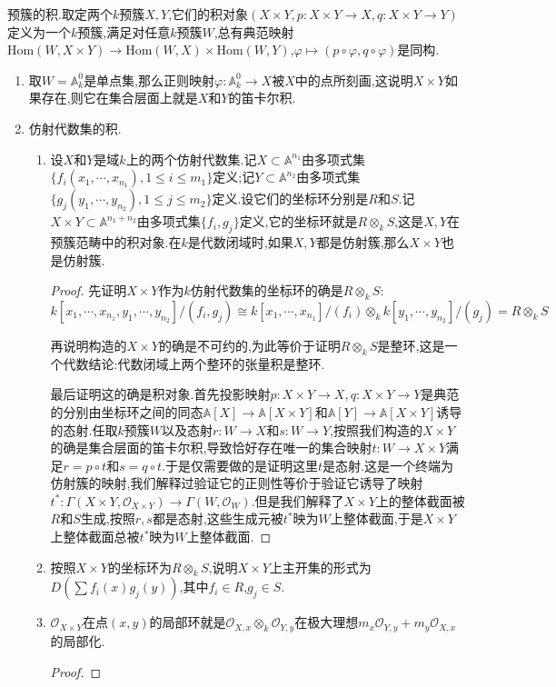 预簇的积.取定两个$k$预簇$X,Y$,它们的积对象$(X\times Y,p:X\times Y\to X,q:X\times Y\to Y)$定义为一个$k$预簇,满足对任意$k$预簇$W$,总有典范映射$\mathrm{Hom}(W,X\times Y)\to\mathrm{Hom}(W,X)\times\mathrm{Hom}(W,Y)$,$\varphi\mapsto(p\circ\varphi,q\circ\varphi)$是同构.
\begin{enumerate}
	\item 取$W=\mathbb{A}^0_k$是单点集,那么正则映射$\varphi:\mathbb{A}_k^0\to X$被$X$中的点所刻画,这说明$X\times Y$如果存在,则它在集合层面上就是$X$和$Y$的笛卡尔积.
	\item 仿射代数集的积.
	\begin{enumerate}
		\item 设$X$和$Y$是域$k$上的两个仿射代数集.记$X\subset\mathbb{A}^{n_1}$由多项式集$\{f_i(x_1,\cdots,x_{n_1}),1\le i\le m_1\}$定义;记$Y\subset\mathbb{A}^{n_2}$由多项式集$\{g_j(y_1,\cdots,y_{n_2}),1\le j\le m_2\}$定义.设它们的坐标环分别是$R$和$S$.记$X\times Y\subset\mathbb{A}^{n_1+n_2}$由多项式集$\{f_i,g_j\}$定义,它的坐标环就是$R\otimes_kS$,这是$X,Y$在预簇范畴中的积对象.在$k$是代数闭域时,如果$X,Y$都是仿射簇,那么$X\times Y$也是仿射簇.
		\begin{proof}
			
			先证明$X\times Y$作为$k$仿射代数集的坐标环的确是$R\otimes_kS$:
			$$k[x_1,\cdots,x_{n_1},y_1,\cdots,y_{n_2}]/(f_i,g_j)\cong k[x_1,\cdots,x_{n_1}]/(f_i)\otimes_kk[y_1,\cdots,y_{n_2}]/(g_j)=R\otimes_kS$$
			
			再说明构造的$X\times Y$的确是不可约的,为此等价于证明$R\otimes_kS$是整环,这是一个代数结论:代数闭域上两个整环的张量积是整环.
			
			\qquad
			
			最后证明这的确是积对象.首先投影映射$p:X\times Y\to X,q:X\times Y\to Y$是典范的分别由坐标环之间的同态$\mathbb{A}[X]\to\mathbb{A}[X\times Y]$和$\mathbb{A}[Y]\to\mathbb{A}[X\times Y]$诱导的态射.任取$k$预簇$W$以及态射$r:W\to X$和$s:W\to Y$,按照我们构造的$X\times Y$的确是集合层面的笛卡尔积,导致恰好存在唯一的集合映射$t:W\to X\times Y$满足$r=p\circ t$和$s=q\circ t$.于是仅需要做的是证明这里$t$是态射.这是一个终端为仿射簇的映射,我们解释过验证它的正则性等价于验证它诱导了映射$t^*:\Gamma(X\times Y,\mathscr{O}_{X\times Y})\to\Gamma(W,\mathscr{O}_W)$.但是我们解释了$X\times Y$上的整体截面被$R$和$S$生成,按照$r,s$都是态射,这些生成元被$t^*$映为$W$上整体截面,于是$X\times Y$上整体截面总被$t^*$映为$W$上整体截面.
		\end{proof}
		\item 按照$X\times Y$的坐标环为$R\otimes_kS$,说明$X\times Y$上主开集的形式为$D(\sum f_i(x)g_j(y))$,其中$f_i\in R$,$g_j\in S$.
		\item $\mathscr{O}_{X\times Y}$在点$(x,y)$的局部环就是$\mathscr{O}_{X,x}\otimes_k\mathscr{O}_{Y,y}$在极大理想$m_x\mathscr{O}_{Y,y}+m_y\mathscr{O}_{X,x}$的局部化.
		\begin{proof}
			

\end{proof}
\end{enumerate}
\end{enumerate}

